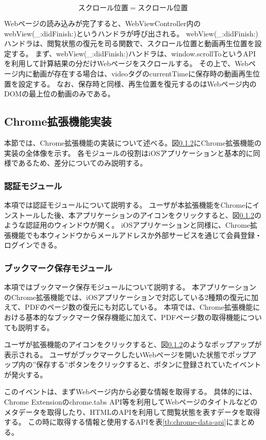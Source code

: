 \begin{equation}
スクロール位置 = スクロール位置
\end{equation}

Webページの読み込みが完了すると、WebViewController内のwebView(\_:didFinish:)\cite{didFinish}というハンドラが呼び出される。
webView(\_:didFinish:)ハンドラは、閲覧状態の復元を司る関数で、スクロール位置と動画再生位置を設定する。
まず、webView(\_:didFinish:)ハンドラは、window.scrollToというAPIを利用して計算結果の分だけWebページをスクロールする。
その上で、Webページ内に動画が存在する場合は、videoタグのcurrentTimeに保存時の動画再生位置を設定する。
なお、保存時と同様、再生位置を復元するのはWebページ内のDOMの最上位の動画のみである。


\subsection{Chrome拡張機能実装}
本節では、Chrome拡張機能の実装について述べる。図\ref{}にChrome拡張機能の実装の全体像を示す。
各モジュールの役割はiOSアプリケーションと基本的に同様であるため、差分についてのみ説明する。

\subsubsection{認証モジュール}
本項では認証モジュールについて説明する。
ユーザが本拡張機能をChromeにインストールした後、本アプリケーションのアイコンをクリックすると、図\ref{}のような認証用のウィンドウが開く。
iOSアプリケーションと同様に、Chrome拡張機能でも本ウィンドウからメールアドレスか外部サービスを通じて会員登録・ログインできる。

\subsubsection{ブックマーク保存モジュール}
本項ではブックマーク保存モジュールについて説明する。
本アプリケーションのChrome拡張機能では、iOSアプリケーションで対応している2種類の復元に加えて、PDFのページ数の復元にも対応している。
本項では、Chrome拡張機能における基本的なブックマーク保存機能に加えて、PDFページ数の取得機能についても説明する。

ユーザが拡張機能のアイコンをクリックすると、図\ref{}のようなポップアップが表示される。
ユーザがブックマークしたいWebページを開いた状態でポップアップ内の”保存する”ボタンをクリックすると、ボタンに登録されていたイベントが発火する。

このイベントは、まずWebページ内から必要な情報を取得する。
具体的には、Chrome Extensionのchrome.tabs API等を利用してWebページのタイトルなどのメタデータを取得したり、HTMLのAPIを利用して閲覧状態を表すデータを取得する。
この時に取得する情報と使用するAPIを表\ref{tb:chrome-data-api}にまとめる。

